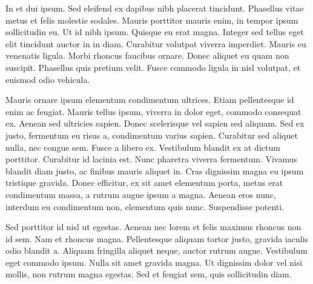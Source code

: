 In et dui ipsum. Sed eleifend ex dapibus nibh placerat tincidunt. Phasellus vitae metus et felis molestie sodales. Mauris porttitor mauris enim, in tempor ipsum sollicitudin eu. Ut id nibh ipsum. Quisque eu erat magna. Integer sed tellus eget elit tincidunt auctor in in diam. Curabitur volutpat viverra imperdiet. Mauris eu venenatis ligula. Morbi rhoncus faucibus ornare. Donec aliquet eu quam non suscipit. Phasellus quis pretium velit. Fusce commodo ligula in nisl volutpat, et euismod odio vehicula.

Mauris ornare ipsum elementum condimentum ultrices. Etiam pellentesque id enim ac feugiat. Mauris tellus ipsum, viverra in dolor eget, commodo consequat ex. Aenean sed ultricies sapien. Donec scelerisque vel sapien sed aliquam. Sed ex justo, fermentum eu risus a, condimentum varius sapien. Curabitur sed aliquet nulla, nec congue sem. Fusce a libero ex. Vestibulum blandit ex at dictum porttitor. Curabitur id lacinia est. Nunc pharetra viverra fermentum. Vivamus blandit diam justo, ac finibus mauris aliquet in. Cras dignissim magna eu ipsum tristique gravida. Donec efficitur, ex sit amet elementum porta, metus erat condimentum massa, a rutrum augue ipsum a magna. Aenean eros nunc, interdum eu condimentum non, elementum quis nunc. Suspendisse potenti.

Sed porttitor id nisl ut egestas. Aenean nec lorem et felis maximus rhoncus non id sem. Nam et rhoncus magna. Pellentesque aliquam tortor justo, gravida iaculis odio blandit a. Aliquam fringilla aliquet neque, auctor rutrum augue. Vestibulum eget commodo ipsum. Nulla sit amet gravida magna. Ut dignissim dolor vel nisi mollis, non rutrum magna egestas. Sed et feugiat sem, quis sollicitudin diam.
